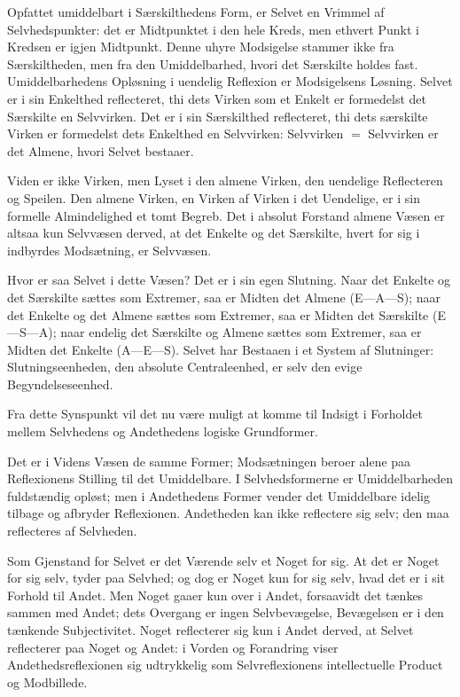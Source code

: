 \documentclass[12pt]{book}
\newcommand{\opage}[1]{\marginnote{\footnotesize\textit{[#1]}}}
\begin{document}
Opfattet umiddelbart i Særskilthedens Form, er Selvet en Vrimmel af
Selvhedspunkter: det er Midtpunktet i den hele Kreds, men ethvert
Punkt i Kredsen er igjen Midtpunkt. Denne uhyre Modsigelse stammer
ikke fra Særskiltheden, men fra den Umiddelbarhed, hvori det
Særskilte holdes fast. Umiddelbarhedens Opløsning i uendelig
Reflexion er Modsigelsens Løsning. Selvet er i sin Enkelthed
reflecteret, thi dets Virken som et Enkelt er formedelst det
Særskilte en Selvvirken. Det er i sin Særskilthed reflecteret, thi
dets særskilte Virken er formedelst dets Enkelthed en Selvvirken:
Selvvirken $=$ Selvvirken er det Almene, hvori Selvet bestaaer.

Viden er ikke Virken, men Lyset i den almene Virken, den uendelige
Reflecteren og Speilen. Den almene Virken, en Virken af Virken i det
Uendelige, er i sin formelle Almindelighed et tomt Begreb. Det i
absolut Forstand almene Væsen er altsaa kun Selvvæsen derved, at det
Enkelte og det Særskilte, hvert for sig i indbyrdes Modsætning, er
Selvvæsen.

Hvor er saa Selvet i dette Væsen? Det er i sin egen Slutning. Naar
det Enkelte og det Særskilte sættes som Extremer, saa er Midten det
Almene (E---A---S); naar det Enkelte og det Almene sættes som
Extremer, saa er Midten
\opage{7} det Særskilte (E---S---A); naar endelig det Særskilte og Almene
sættes som Extremer, saa er Midten det Enkelte (A---E---S). Selvet
har Bestaaen i et System af Slutninger: Slutningseenheden, den
absolute Centraleenhed, er selv den evige Begyndelseseenhed.

Fra dette Synspunkt vil det nu være muligt at komme til Indsigt i
Forholdet mellem Selvhedens og Andethedens logiske Grundformer.

Det er i Videns Væsen de samme Former; Modsætningen beroer alene paa
Reflexionens Stilling til det Umiddelbare. I Selvhedsformerne er
Umiddelbarheden fuldstændig opløst; men i Andethedens Former vender
det Umiddelbare idelig tilbage og afbryder Reflexionen. Andetheden
kan ikke reflectere sig selv; den maa reflecteres af Selvheden.

Som Gjenstand for Selvet er det Værende selv et Noget for sig. At det
er Noget for sig selv, tyder paa Selvhed; og dog er Noget kun for sig
selv, hvad det er i sit Forhold til Andet. Men Noget gaaer kun over i
Andet, forsaavidt det tænkes sammen med Andet; dets Overgang er ingen
Selvbevægelse, Bevægelsen er i den tænkende Subjectivitet. Noget
reflecterer sig kun i Andet derved, at Selvet reflecterer paa Noget
og Andet: i Vorden og Forandring viser Andethedsreflexionen sig
udtrykkelig som Selvreflexionens intellectuelle Product og
Modbillede.
\end{document}
